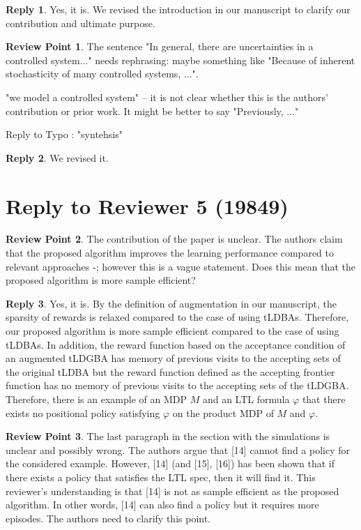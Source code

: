 \documentclass[10 pt, dvipdfmx]{article}
\theoremstyle{definition}
\newtheorem{review point}{Review Point}[section]
\newtheorem*{reply}{Reply}
\begin{document}
\begin{reply}
  Yes, it is. We revised the introduction in our manuscript to clarify our contribution and ultimate purpose.
\end{reply}

\begin{review point}
  The sentence "In general, there are uncertainties in a controlled
system..." needs rephrasing: maybe something like "Because of inherent
stochasticity of many controlled systems, ...".

"we model a controlled system" -- it is not clear whether this is the
authors' contribution or prior work. It might be better to say
"Previously, ..."

Reply to Typo : "syntehsis"
\end{review point}

\begin{reply}
  We revised it.
\end{reply}

\section{Reply to Reviewer 5 (19849)}

\begin{review point}
  The contribution of the paper is unclear. The authors claim that the
proposed algorithm improves the learning performance compared to
relevant approaches \cite{Hahn2019}-\cite{BWZP2019}; however this is a vague statement. Does
this mean that the proposed algorithm is more sample efficient?
\end{review point}

\begin{reply}
  Yes, it is. By the definition of augmentation in our manuscript, the sparsity of rewards is relaxed compared to the case of using tLDBAs. Therefore, our proposed algorithm is more sample efficient compared to the case of using tLDBAs. In addition, the reward function based on the acceptance condition of an augmented tLDGBA has memory of previous visits to the accepting sets of the original tLDBA but the reward function defined as the accepting frontier function \cite{HAK2019} has no memory of previous visits to the accepting sets of the tLDGBA. Therefore, there is an example of an MDP $M$ and an LTL formula $\varphi$ that there exists no positional policy satisfying $\varphi$ on the product MDP of $M$ and $\varphi$.
\end{reply}

\begin{review point}
  The last paragraph in the section with the simulations is unclear
and possibly wrong. The authors argue that [14] cannot find a policy
for the considered example. However, [14] (and [15], [16]) has been
shown that if there exists a policy that satisfies the LTL spec, then
it will find it. This reviewer's understanding is that [14] is not as
sample efficient as the proposed algorithm. In other words, [14] can
also find a policy but it requires more episodes. The authors need to
clarify this point.
\end{review point}
\end{document}
